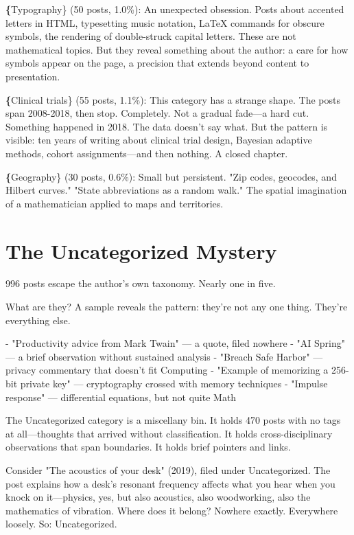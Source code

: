 \textbf\{Typography\} (50 posts, 1.0\%): An unexpected obsession. Posts about accented letters in HTML, typesetting music notation, LaTeX commands for obscure symbols, the rendering of double-struck capital letters. These are not mathematical topics. But they reveal something about the author: a care for how symbols appear on the page, a precision that extends beyond content to presentation.

\textbf\{Clinical trials\} (55 posts, 1.1\%): This category has a strange shape. The posts span 2008-2018, then stop. Completely. Not a gradual fade—a hard cut. Something happened in 2018. The data doesn't say what. But the pattern is visible: ten years of writing about clinical trial design, Bayesian adaptive methods, cohort assignments—and then nothing. A closed chapter.

\textbf\{Geography\} (30 posts, 0.6\%): Small but persistent. "Zip codes, geocodes, and Hilbert curves." "State abbreviations as a random walk." The spatial imagination of a mathematician applied to maps and territories.

\bigskip

\section*{The Uncategorized Mystery}

996 posts escape the author's own taxonomy. Nearly one in five.

What are they? A sample reveals the pattern: they're not any one thing. They're everything else.

- "Productivity advice from Mark Twain" — a quote, filed nowhere
- "AI Spring" — a brief observation without sustained analysis
- "Breach Safe Harbor" — privacy commentary that doesn't fit Computing
- "Example of memorizing a 256-bit private key" — cryptography crossed with memory techniques
- "Impulse response" — differential equations, but not quite Math

The Uncategorized category is a miscellany bin. It holds 470 posts with no tags at all—thoughts that arrived without classification. It holds cross-disciplinary observations that span boundaries. It holds brief pointers and links.

Consider "The acoustics of your desk" (2019), filed under Uncategorized. The post explains how a desk's resonant frequency affects what you hear when you knock on it—physics, yes, but also acoustics, also woodworking, also the mathematics of vibration. Where does it belong? Nowhere exactly. Everywhere loosely. So: Uncategorized.

